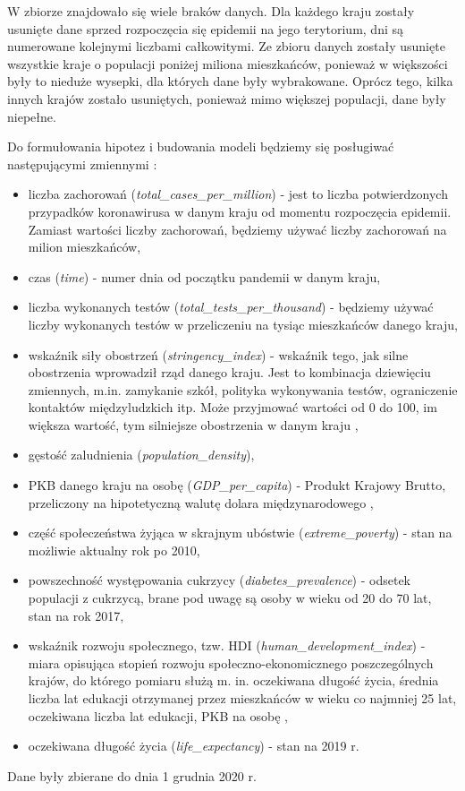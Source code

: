 \documentclass[12pt]{mwbk}
\theoremstyle{plain}
\theoremstyle{definition}
\theoremstyle{definition}
\begin{document}
W zbiorze znajdowało się wiele braków danych. Dla każdego kraju zostały usunięte dane sprzed rozpoczęcia się epidemii na jego terytorium, dni są numerowane kolejnymi liczbami całkowitymi.
Ze zbioru danych zostały usunięte wszystkie kraje o populacji poniżej miliona mieszkańców, ponieważ w większości były to nieduże wysepki, dla których dane były wybrakowane. Oprócz tego, kilka innych krajów zostało usuniętych, ponieważ mimo większej populacji, dane były niepełne.

Do formułowania hipotez i budowania modeli będziemy się posługiwać następującymi zmiennymi \cite{codebook}:
\begin{itemize}
	\item liczba zachorowań (\textit{total\_cases\_per\_million}) - jest to liczba potwierdzonych przypadków koronawirusa w danym kraju od momentu rozpoczęcia epidemii. Zamiast wartości liczby zachorowań, będziemy używać liczby zachorowań na milion mieszkańców,
	\item czas (\textit{time}) - numer dnia od początku pandemii w danym kraju,
	\item liczba wykonanych testów (\textit{total\_tests\_per\_thousand}) - będziemy używać liczby wykonanych testów w przeliczeniu na tysiąc mieszkańców danego kraju,
	\item wskaźnik siły obostrzeń (\textit{stringency\_index}) - wskaźnik tego, jak silne obostrzenia wprowadził rząd danego kraju. Jest to kombinacja dziewięciu zmiennych, m.in. zamykanie szkół, polityka wykonywania testów, ograniczenie kontaktów międzyludzkich itp. Może przyjmować wartości od 0 do 100, im większa wartość, tym silniejsze obostrzenia w danym kraju \cite{stringency},
	\item gęstość zaludnienia (\textit{population\_density}),
	\item PKB danego kraju na osobę (\textit{GDP\_per\_capita}) - Produkt Krajowy Brutto, przeliczony na hipotetyczną walutę dolara międzynarodowego \cite{dollars},
	\item część społeczeństwa żyjąca w skrajnym ubóstwie (\textit{extreme\_poverty}) - stan na możliwie aktualny rok po 2010,
	\item powszechność występowania cukrzycy (\textit{diabetes\_prevalence}) - odsetek populacji z cukrzycą, brane pod uwagę są osoby w wieku od 20 do 70 lat, stan na rok 2017,
	\item wskaźnik rozwoju społecznego, tzw. HDI (\textit{human\_development\_index}) -  miara opisująca stopień rozwoju społeczno-ekonomicznego poszczególnych krajów, do którego pomiaru służą m. in. oczekiwana długość życia, średnia liczba lat edukacji otrzymanej przez mieszkańców w wieku co najmniej 25 lat, oczekiwana liczba lat edukacji, PKB na osobę \cite{hdi},
	\item oczekiwana długość życia (\textit{life\_expectancy}) - stan na 2019 r.
	
\end{itemize}
Dane były zbierane do dnia 1 grudnia 2020 r. 
\end{document}
